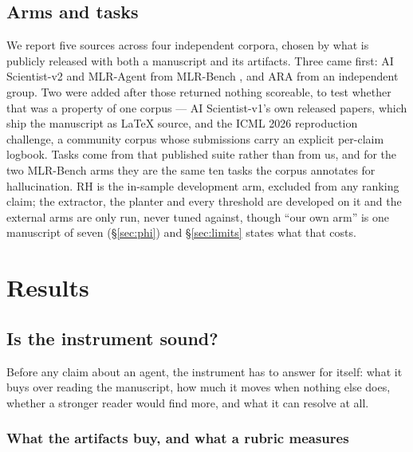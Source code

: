 \documentclass[10pt]{article}
\newcommand{\RM}[1]{{#1}}
\begin{document}
\subsection{Arms and tasks}
We report \RM{five} sources across \RM{four} independent corpora, chosen by what
is publicly released with both a manuscript and its artifacts. Three came first:
AI Scientist-v2 and MLR-Agent from MLR-Bench \cite{mlrbench}, and ARA
\cite{ara} from an independent group. Two were added after those returned
nothing scoreable, to test whether that was a property of one corpus ---
AI Scientist-v1's own released papers, which ship the manuscript as LaTeX
source, and the ICML 2026 reproduction challenge, a community corpus whose
submissions carry an explicit per-claim logbook. Tasks come from that published suite rather than from us, and for the two
MLR-Bench arms they are the same ten tasks the corpus annotates for
hallucination. RH is the in-sample development arm, excluded from any ranking
claim; the extractor, the planter and every threshold are developed on it and
the external arms are only run, never tuned against, though ``our own arm'' is
one manuscript of seven (\S\ref{sec:phi}) and \S\ref{sec:limits} states what
that costs. 

\section{Results}
\label{sec:resultsec}

\subsection{Is the instrument sound?}
Before any claim about an agent, the instrument has to answer for itself: what it
buys over reading the manuscript, how much it moves when nothing else does, whether
a stronger reader would find more, and what it can resolve at all.

\subsubsection{What the artifacts buy, and what a rubric measures}
\label{sec:e4}
\label{sec:instrument}
\end{document}
